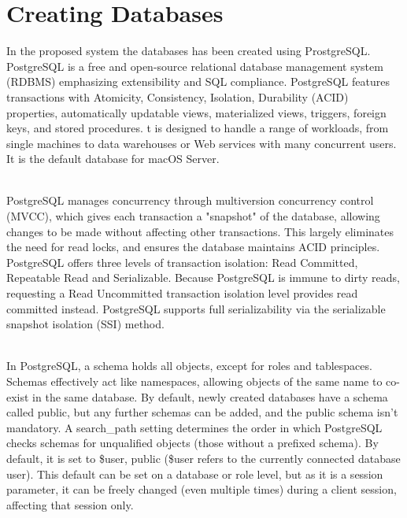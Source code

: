 \documentclass[12pt,a4paper]{report}
\begin{document}
\section{Creating Databases}
\hspace{0.25cm}
\par
In the proposed system the databases has been created using ProstgreSQL. PostgreSQL is a free and open-source relational database management system (RDBMS) emphasizing extensibility and SQL compliance. PostgreSQL features transactions with Atomicity, Consistency, Isolation, Durability (ACID) properties, automatically updatable views, materialized views, triggers, foreign keys, and stored procedures. t is designed to handle a range of workloads, from single machines to data warehouses or Web services with many concurrent users. It is the default database for macOS Server.
\\
\\
\par
PostgreSQL manages concurrency through multiversion concurrency control (MVCC), which gives each transaction a "snapshot" of the database, allowing changes to be made without affecting other transactions. This largely eliminates the need for read locks, and ensures the database maintains ACID principles. PostgreSQL offers three levels of transaction isolation: Read Committed, Repeatable Read and Serializable. Because PostgreSQL is immune to dirty reads, requesting a Read Uncommitted transaction isolation level provides read committed instead. PostgreSQL supports full serializability via the serializable snapshot isolation (SSI) method.
\\
\\
\par
In PostgreSQL, a schema holds all objects, except for roles and tablespaces. Schemas effectively act like namespaces, allowing objects of the same name to co-exist in the same database. By default, newly created databases have a schema called public, but any further schemas can be added, and the public schema isn't mandatory. A search\_path setting determines the order in which PostgreSQL checks schemas for unqualified objects (those without a prefixed schema). By default, it is set to \$user, public (\$user refers to the currently connected database user). This default can be set on a database or role level, but as it is a session parameter, it can be freely changed (even multiple times) during a client session, affecting that session only.
\end{document}
